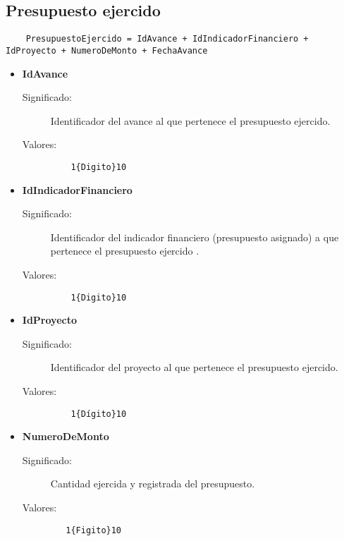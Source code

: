 \subsection{Presupuesto ejercido}
\label{dd:PresupuestoEjercido}
\begin{lstlisting}
    PresupuestoEjercido = IdAvance + IdIndicadorFinanciero + IdProyecto + NumeroDeMonto + FechaAvance
\end{lstlisting}
 \begin{itemize}

    \item \textbf{IdAvance}
      \begin{description}
        \item [Significado:] Identificador del avance al que pertenece el presupuesto ejercido.
        \item [Valores:]{\begin{lstlisting}
	1{Digito}10\end{lstlisting}}\end{description}

    \item \textbf{IdIndicadorFinanciero}
      \begin{description}
        \item [Significado:] Identificador del indicador financiero (presupuesto asignado) a que pertenece el presupuesto ejercido .
        \item [Valores:]{\begin{lstlisting}
	1{Digito}10
\end{lstlisting}}\end{description}
 
\item \textbf{IdProyecto}
      \begin{description}
        \item [Significado:] Identificador del proyecto al que pertenece el presupuesto ejercido.
        \item [Valores:]{\begin{lstlisting}
	1{Dígito}10
\end{lstlisting}}\end{description}

    \item \textbf{NumeroDeMonto}
      \begin{description}
        \item [Significado:] Cantidad ejercida y registrada del presupuesto.
        \item [Valores:]{\begin{lstlisting}
   1{Figito}10
\end{lstlisting}}\end{description}


\end{itemize}
